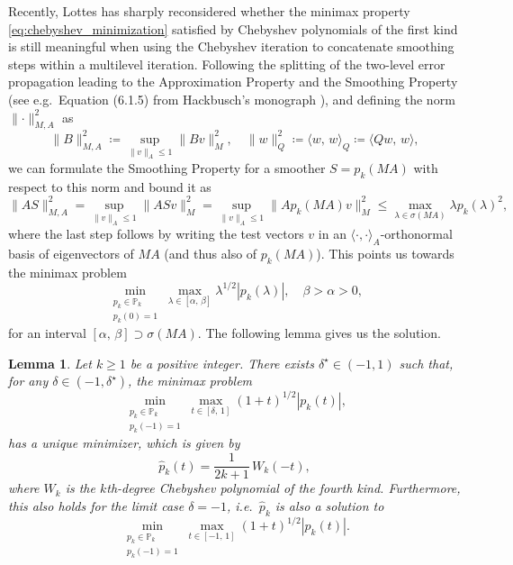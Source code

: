 \documentclass[a4paper]{article}
\newcommand{\norm}[1]{\lVert#1\rVert}
\theoremstyle{plain}
\newtheorem{lemma}{Lemma}[section]
\theoremstyle{definition}
\theoremstyle{remark}
\begin{document}
Recently, Lottes \cite{Lottes2023} has sharply reconsidered whether the minimax property \eqref{eq:chebyshev_minimization} satisfied by Chebyshev polynomials of the first kind is still meaningful when using the Chebyshev iteration to concatenate smoothing steps within a multilevel iteration. Following the splitting of the two-level error propagation leading to the Approximation Property and the Smoothing Property (see e.g.\ Equation (6.1.5) from Hackbusch's monograph \cite{Hackbusch1985}), and defining the norm \(\norm{\cdot}^2_{M,A}\) as
\begin{equation*}
	\norm{B}^2_{M,A} \coloneqq \sup_{\norm{v}_A \leq 1} \norm{Bv}^2_M, \quad \norm{w}^2_Q \coloneqq \langle w,\, w \rangle_Q \coloneqq \langle Q w,\, w \rangle,
\end{equation*}
we can formulate the Smoothing Property for a smoother \(S = p_k(MA)\) with respect to this norm and bound it as
\begin{equation}\label{eq:chebyshev_smoothing_bound}
	\norm{A S}^2_{M,A} = \sup_{\norm{v}_A \leq 1} \norm{A S v}^2_{M} = \sup_{\norm{v}_A \leq 1} \norm{A p_k(MA) v}^2_{M} \leq \max_{\lambda \in \sigma(MA)} \lambda p_k(\lambda)^2,
\end{equation}
where the last step follows by writing the test vectors \(v\) in an \(\langle \cdot,\cdot \rangle_A\)-orthonormal basis of eigenvectors of \(MA\) (and thus also of \(p_k(MA)\)). This points us towards the minimax problem
\begin{equation}\label{eq:chebyshev_smoother_minimization}
	\min_{\substack{p_k \in \mathbb{P}_k\\ p_k(0) = 1}} \max_{\lambda\in [\alpha,\, \beta]} \lambda^{1/2} |p_k(\lambda)|, \quad \beta > \alpha > 0,
\end{equation}
for an interval \([\alpha,\, \beta] \supset \sigma(MA)\). The following lemma gives us the solution.

\begin{lemma}\label{thm:weighted_minimax}
	Let \(k \geq 1\) be a positive integer. There exists \(\delta^{\star} \in (-1, 1)\) such that, for any \(\delta \in (-1, \delta^{\star})\), the minimax problem
	\begin{equation}\label{eq:weighted_minimax_lemma}
		\min_{\substack{p_k \in \mathbb{P}_k\\ p_k(-1) = 1}} \max_{t\in [\delta,\, 1]} (1 + t)^{1/2} |p_k(t)|,
	\end{equation}
	has a unique minimizer, which is given by
	\begin{equation*}
		\hat{p}_k(t) = \frac{1}{2k+1}\, W_k\left( -t \right),
	\end{equation*}
	where \(W_k\) is the \(k\)th-degree Chebyshev polynomial \emph{of the fourth kind}. Furthermore, this also holds for the limit case \(\delta = -1\), i.e.\ \(\hat{p}_k\) is also a solution to
	\begin{equation*}
		\min_{\substack{p_k \in \mathbb{P}_k\\ p_k(-1) = 1}} \max_{t\in [-1,\, 1]} (1 + t)^{1/2} |p_k(t)|.
	\end{equation*}
\end{lemma}
\end{document}
